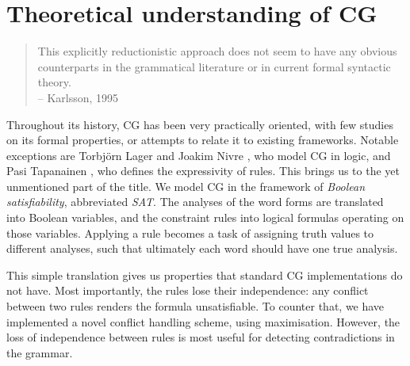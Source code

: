 

\section{Theoretical understanding of CG}

\begin{quote}
This explicitly reductionistic approach does not seem to have any obvious counterparts in the grammatical literature or in current formal syntactic theory. \\
-- Karlsson, 1995 \cite{karlsson1995constraint}
\end{quote}

Throughout its history, CG has been very practically oriented, with 
few studies on its formal properties, or attempts to relate it to existing
frameworks.
Notable exceptions are Torbjörn Lager and Joakim Nivre \cite{lager_nivre01}, who model CG in logic, and Pasi Tapanainen
\cite{tapanainen1999phd}, who defines the expressivity of rules.
This brings us to the yet unmentioned part of the title.
We model CG in the framework of \emph{Boolean satisfiability}, abbreviated \emph{SAT}.
The analyses of the word forms are translated into Boolean variables, 
and the constraint rules into logical formulas operating on those variables.
Applying a rule becomes a task of assigning truth values to different analyses,
such that ultimately each word should have one true analysis.

This simple translation gives us properties that standard CG implementations do not have.
Most importantly, the rules lose their independence: any conflict between two rules renders the formula unsatisfiable. To counter that, we have implemented a novel conflict handling scheme, using maximisation. However, the loss of independence between rules is most useful for detecting contradictions in the grammar.




